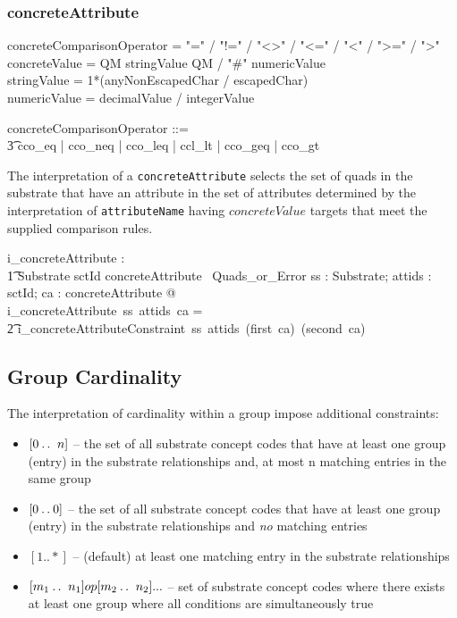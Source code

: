 \documentclass{article}
\def\spec#1{{\tt #1}}
\def\bnf#1{{\scriptsize {{#1}} }}
\begin{document}
\subsubsection{concreteAttribute}
\begin{framed}
\noindent
\bnf{concreteComparisonOperator = "=" / "!=" /  "\textless\textgreater" / "\textless=" / "\textless" / "\textgreater=" / "\textgreater"} \\
\bnf{concreteValue =  QM stringValue QM / "\#" numericValue} \\
\bnf{stringValue = 1*(anyNonEscapedChar / escapedChar)} \\
\bnf{numericValue = decimalValue / integerValue}
\end{framed}
\begin{zed}
concreteComparisonOperator ::= \\
\t3 cco\_eq | cco\_neq | cco\_leq | ccl\_lt | cco\_geq | cco\_gt 
\end{zed}


The interpretation of a \spec{concreteAttribute} selects the set of quads in the substrate that have an attribute in the set of attributes 
determined by the interpretation of \spec{attributeName} having $concreteValue$ targets that meet the supplied comparison rules.

\begin{gendef}
   i\_concreteAttribute : \\
\t1 Substrate \fun \power sctId \fun concreteAttribute \fun \ Quads\_or\_Error
\where
   \forall ss : Substrate; attids : \power sctId; ca : concreteAttribute @ \\
   i\_concreteAttribute~ss~attids~ca = \\
\t2 i\_concreteAttributeConstraint~ss~attids~(first~ca)~(second~ca)
\end{gendef}
   
 

\subsection{Group Cardinality}
The interpretation of cardinality within a group impose additional constraints:
\begin{itemize}[noitemsep,nolistsep]
\item{$[0\mathbin{\ldotp\ldotp}~n]$} -- the set of all substrate concept codes that have at least one group (entry) in the substrate relationships and,
at most n matching entries in the same group
\item{$[0\mathbin{\ldotp\ldotp}0]$} -- the set of all substrate concept codes that have at least one group (entry) in the substrate relationships and \emph{no} matching entries 
\item{$[1..*]$} -- (default) at least one matching entry in the substrate relationships
\item{$[m_1\mathbin{\ldotp\ldotp}~n_1] op [m_2\mathbin{\ldotp\ldotp}~n_2] ... $} -- set of substrate concept codes where there exists at least one group where all conditions are simultaneously true
\end{itemize}
\end{document}
